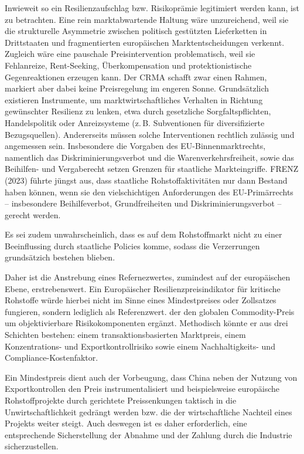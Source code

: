 \documentclass[12pt,a4paper,oneside]{book} %
\begin{document}
Inwieweit so ein Resilienzaufschlag bzw. Risikoprämie legitimiert werden kann, ist zu betrachten.  Eine rein marktabwartende Haltung wäre unzureichend, weil sie die strukturelle Asymmetrie zwischen politisch gestützten Lieferketten in Drittstaaten und fragmentierten europäischen Marktentscheidungen verkennt. Zugleich wäre eine pauschale Preisintervention problematisch, weil sie Fehlanreize, Rent-Seeking, Überkompensation und protektionistische Gegenreaktionen erzeugen kann. Der CRMA schafft zwar einen Rahmen, markiert aber dabei keine Preisregelung im engeren Sonne. Grundsätzlich existieren Instrumente, um marktwirtschaftliches Verhalten in Richtung gewünschter Resilienz zu lenken, etwa durch gesetzliche Sorgfaltspflichten, Handelspolitik oder Anreizsysteme (z. B. Subventionen für diversifizierte Bezugsquellen). Andererseits müssen solche Interventionen rechtlich zulässig und angemessen sein. Insbesondere die Vorgaben des EU-Binnenmarktrechts, namentlich das Diskriminierungsverbot und die Warenverkehrsfreiheit, sowie das Beihilfen- und Vergaberecht setzen Grenzen für staatliche Markteingriffe. FRENZ (2023) führte jüngst aus, dass staatliche Rohstoffaktivitäten nur dann Bestand haben können, wenn sie den vielschichtigen Anforderungen des EU-Primärrechts – insbesondere Beihilfeverbot, Grundfreiheiten und Diskriminierungsverbot – gerecht werden.

Es sei zudem unwahrscheinlich, dass es auf dem Rohstoffmarkt nicht zu einer Beeinflussing durch staatliche Policies komme, sodass die Verzerrungen grundsätzich bestehen blieben.\autocite{https://www.spglobal.com/energy/en/news-research/latest-news/metals/052926-us-rare-earth-price-floors-aim-to-challenge-chinas-market-grip}




Daher ist die Anstrebung eines Refernezwertes, zumindest auf der europäischen Ebene, erstrebenswert. Ein Europäischer Resilienzpreisindikator für kritische Rohstoffe würde hierbei nicht im Sinne eines Mindestpreises oder Zollsatzes fungieren, sondern lediglich als Referenzwert. der den globalen Commodity-Preis um objektivierbare Risikokomponenten ergänzt. Methodisch könnte er aus drei Schichten bestehen: einem transaktionsbasierten Marktpreis, einem Konzentrations- und Exportkontrollrisiko sowie einem Nachhaltigkeits- und Compliance-Kostenfaktor.

Ein Mindestpreis dient auch der Vorbeugung, dass China neben der Nutzung von Exportkontrollen den Preis instrumentalisiert und beispielsweise europäische Rohstoffprojekte durch gerichtete Preissenkungen taktisch in die Unwirtschaftlichkeit gedrängt werden bzw. die der wirtschaftliche Nachteil eines Projekts weiter steigt. Auch deswegen ist es daher erforderlich, eine entsprechende Sicherstellung der Abnahme und der Zahlung durch die Industrie sicherzustellen.
\end{document}
